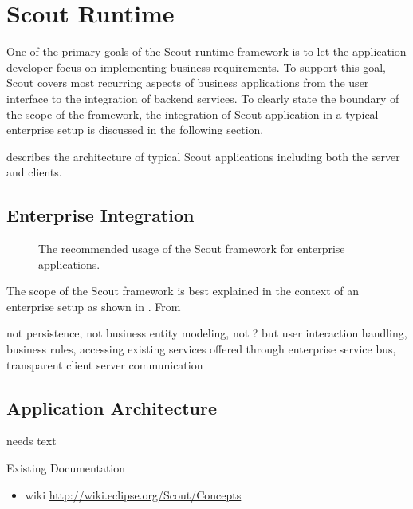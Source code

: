 \documentclass[a4paper,10pt,twoside]{book}
\begin{document}
  \sloppy
\fi


\chapter{Scout Runtime}

One of the primary goals of the Scout runtime framework is to let the application developer focus on implementing business requirements. 
To support this goal, Scout covers most recurring aspects of business applications from the user interface to the integration of backend services. 
To clearly state the boundary of the scope of the framework, the integration of Scout application in a typical enterprise setup is discussed in the following section.

 describes the architecture of typical Scout applications including both the server and clients. 


\section{Enterprise Integration}

\begin{figure}
\caption{The recommended usage of the Scout framework for enterprise applications.}
\end{figure}

The scope of the Scout framework is best explained in the context of an enterprise setup as shown in . 
From

not persistence, not business entity modeling, not ?
but user interaction handling, business rules, accessing existing services offered through enterprise service bus, transparent client server communication

\section{Application Architecture}
needs text

\noindent Existing Documentation
\begin{itemize}
  \item wiki \url{http://wiki.eclipse.org/Scout/Concepts}
\end{itemize}
\end{document}
